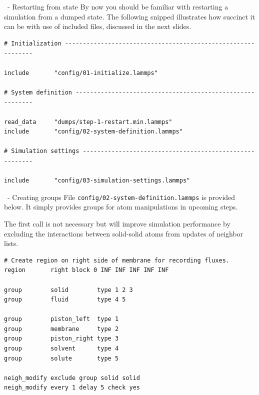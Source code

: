 \begin{frame}[fragile]{\secname}{\subsecname\ - Restarting from state}
By now you should be familiar with restarting a simulation from a dumped state. The following snipped illustrates how succinct it can be with use of included files, discussed in the next slides.

\vspace{0.5cm}

\begin{lstlisting}[language=LAMMPS,basicstyle=\tiny]
# Initialization -------------------------------------------------------------

include       "config/01-initialize.lammps"

# System definition ----------------------------------------------------------

read_data     "dumps/step-1-restart.min.lammps"
include       "config/02-system-definition.lammps"

# Simulation settings --------------------------------------------------------

include       "config/03-simulation-settings.lammps"
\end{lstlisting}
\end{frame}

\begin{frame}[fragile]{\secname}{\subsecname\ - Creating groups}
File \Verb|config/02-system-definition.lammps| is provided below. It simply provides groups for atom manipulations in upcoming steps.

\vspace{0.5cm}

The first  call is not necessary but will improve simulation performance by excluding the interactions between solid-solid atoms from updates of neighbor lists.

\vspace{0.5cm}

\begin{lstlisting}[language=LAMMPS,basicstyle=\tiny]
# Create region on right side of membrane for recording fluxes.
region       right block 0 INF INF INF INF INF

group        solid        type 1 2 3
group        fluid        type 4 5

group        piston_left  type 1
group        membrane     type 2
group        piston_right type 3
group        solvent      type 4
group        solute       type 5

neigh_modify exclude group solid solid
neigh_modify every 1 delay 5 check yes
\end{lstlisting}
\end{frame}

